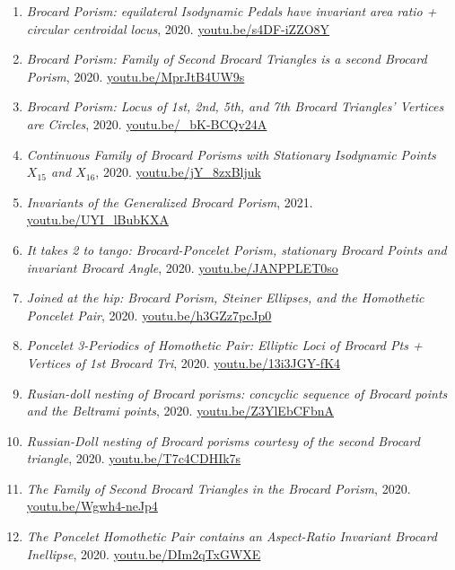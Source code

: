 \documentclass[12pt]{article}
\begin{document}
\begin{enumerate}[resume]
\item \textit{Brocard Porism: equilateral Isodynamic Pedals have invariant area ratio + circular centroidal locus}, 2020. \href{https://youtu.be/s4DF-iZZO8Y}{\url{youtu.be/s4DF-iZZO8Y}}
\item \textit{Brocard Porism: Family of Second Brocard Triangles is a second Brocard Porism}, 2020. \href{https://youtu.be/MprJtB4UW9s}{\url{youtu.be/MprJtB4UW9s}}
\item \textit{Brocard Porism: Locus of 1st, 2nd, 5th, and 7th Brocard Triangles' Vertices are Circles}, 2020. \href{https://youtu.be/_bK-BCQv24A}{\url{youtu.be/\_bK-BCQv24A}}
\item \textit{Continuous Family of Brocard Porisms with Stationary Isodynamic Points $X_{15}$ and $X_{16}$}, 2020. \href{https://youtu.be/jY_8zxBljuk}{\url{youtu.be/jY\_8zxBljuk}}
\item \textit{Invariants of the Generalized Brocard Porism}, 2021. \href{https://youtu.be/UYI_lBubKXA}{\url{youtu.be/UYI\_lBubKXA}}
\item \textit{It takes 2 to tango: Brocard-Poncelet Porism, stationary Brocard Points and invariant Brocard Angle}, 2020. \href{https://youtu.be/JANPPLET0so}{\url{youtu.be/JANPPLET0so}}
\item \textit{Joined at the hip: Brocard Porism, Steiner Ellipses, and the Homothetic Poncelet Pair}, 2020. \href{https://youtu.be/h3GZz7pcJp0}{\url{youtu.be/h3GZz7pcJp0}}
\item \textit{Poncelet 3-Periodics of Homothetic Pair: Elliptic Loci of Brocard Pts + Vertices of 1st Brocard Tri}, 2020. \href{https://youtu.be/13i3JGY-fK4}{\url{youtu.be/13i3JGY-fK4}}
\item \textit{Rusian-doll nesting of Brocard porisms: concyclic sequence of Brocard points and the Beltrami points}, 2020. \href{https://youtu.be/Z3YlEbCFbnA}{\url{youtu.be/Z3YlEbCFbnA}}
\item \textit{Russian-Doll nesting of Brocard porisms courtesy of the second Brocard triangle}, 2020. \href{https://youtu.be/T7c4CDHIk7s}{\url{youtu.be/T7c4CDHIk7s}}
\item \textit{The Family of Second Brocard Triangles in the Brocard Porism}, 2020. \href{https://youtu.be/Wgwh4-neJp4}{\url{youtu.be/Wgwh4-neJp4}}
\item \textit{The Poncelet Homothetic Pair contains an Aspect-Ratio Invariant Brocard Inellipse}, 2020. \href{https://youtu.be/DIm2qTxGWXE}{\url{youtu.be/DIm2qTxGWXE}}
\end{enumerate}
\end{document}
